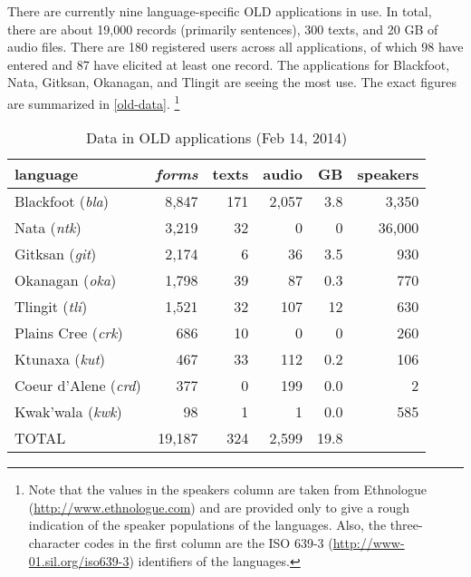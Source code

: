 \documentclass[11pt]{article}
\begin{document}
There are currently nine language-specific OLD applications in use. In total,
there are about 19,000 records (primarily sentences), 300 texts, and 20 GB of
audio files.  There are 180 registered users across all applications, of which
98 have entered and 87 have elicited at least one record. The applications for
Blackfoot, Nata, Gitksan, Okanagan, and Tlingit are seeing the most use. The
exact figures are summarized in \autoref{old-data}.%
\footnote{ Note that the values in the speakers column are taken from
    Ethnologue (\url{http://www.ethnologue.com}) and are provided only to give
    a rough indication of the speaker populations of the languages. Also, the
    three-character codes in the first column are the ISO 639-3
(\url{http://www-01.sil.org/iso639-3}) identifiers of the languages.}


\begin{table}[h]
 \begin{center}
     \scriptsize
\begin{tabular}{lrrrrr}

      \toprule
      language &                     \emph{forms}  & texts & audio & GB   & speakers \\
      \midrule
      Blackfoot (\textit{bla}) &     8,847  & 171   & 2,057 & 3.8  & 3,350    \\ %
      Nata (\textit{ntk}) &          3,219  & 32    & 0     & 0    & 36,000   \\ %
      Gitksan (\textit{git}) &       2,174  & 6     & 36    & 3.5  & 930      \\ %
      Okanagan (\textit{oka}) &      1,798  & 39    & 87    & 0.3  & 770      \\ %
      Tlingit (\textit{tli}) &       1,521  & 32    & 107   & 12   & 630      \\ %
      Plains Cree (\textit{crk}) &   686    & 10    & 0     & 0    & 260      \\ %
      Ktunaxa (\textit{kut}) &       467    & 33    & 112   & 0.2  & 106      \\ %
      Coeur d'Alene (\textit{crd}) & 377    & 0     & 199   & 0.0  & 2        \\ %
      Kwak'wala (\textit{kwk}) &     98     & 1     & 1     & 0.0  & 585      \\ %
      TOTAL &                        19,187 & 324   & 2,599 & 19.8 &         \\ %
      \bottomrule

\end{tabular}
\caption{Data in OLD applications (Feb 14, 2014)}
\label{old-data}
 \end{center}
 \normalsize
\end{table}
\end{document}
